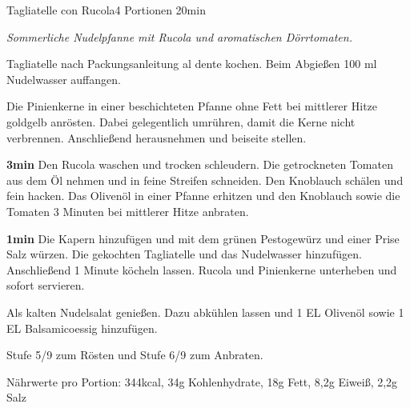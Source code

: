 \documentclass[../recipe-collections/cooking.tex]{subfiles}
\begin{document}
\begin{recipe}{Tagliatelle con Rucola}{4 Portionen }{20min }

  \freeform{}\textit{Sommerliche Nudelpfanne mit Rucola und aromatischen Dörrtomaten.}


  Tagliatelle nach Packungsanleitung al dente kochen.
  Beim Abgießen 100 ml Nudelwasser auffangen.


  Die Pinienkerne in einer beschichteten Pfanne ohne Fett bei mittlerer Hitze goldgelb anrösten.
  Dabei gelegentlich umrühren, damit die Kerne nicht verbrennen.
  Anschließend herausnehmen und beiseite stellen.


  \textbf{3min}
  Den Rucola waschen und trocken schleudern.
  Die getrockneten Tomaten aus dem Öl nehmen und in feine Streifen schneiden.
  Den Knoblauch schälen und fein hacken.
  Das Olivenöl in einer Pfanne erhitzen und den Knoblauch sowie die Tomaten 3 Minuten bei mittlerer Hitze anbraten.


  \textbf{1min}
  Die Kapern hinzufügen und mit dem grünen Pestogewürz und einer Prise Salz würzen.
  Die gekochten Tagliatelle und das Nudelwasser hinzufügen.
  Anschließend 1 Minute köcheln lassen.
  Rucola und Pinienkerne unterheben und sofort servieren.

  \freeform{}\hrulefill{}

  \freeform{}
  Als kalten Nudelsalat genießen. Dazu abkühlen lassen und 1 EL Olivenöl sowie 1 EL Balsamicoessig hinzufügen.

  \freeform{}
  Stufe 5/9 zum Rösten und Stufe 6/9 zum Anbraten.

  \freeform{}
  Nährwerte pro Portion: 344kcal, 34g Kohlenhydrate, 18g Fett, 8,2g Eiweiß, 2,2g Salz

\end{recipe}
\end{document}
